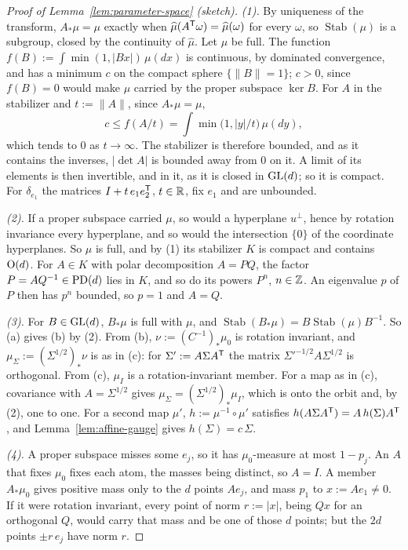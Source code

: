 \begin{proof}[Proof of Lemma~\ref{lem:parameter-space} (sketch)]
\emph{(1).} By uniqueness of the transform, $A_*\mu = \mu$ exactly when
$\widehat\mu(A^{\mathsf{T}}\omega) = \widehat\mu(\omega)$ for every $\omega$, so $\operatorname{Stab}(\mu)$ is
a subgroup, closed by the continuity of $\widehat\mu$. Let $\mu$ be full. The function
$f(B) := \int\min(1, |Bx|)\,\mu(dx)$ is continuous, by dominated convergence, and has a minimum $c$
on the compact sphere $\{\|B\| = 1\}$; $c > 0$, since $f(B) = 0$ would make $\mu$ carried by the
proper subspace $\ker B$. For $A$ in the stabilizer and $t := \|A\|$, since $A_*\mu = \mu$,
\[
  c \le f(A/t) = \int\min\bigl(1, |y|/t\bigr)\,\mu(dy) ,
\]
which tends to $0$ as $t \to \infty$. The stabilizer is therefore bounded, and as it contains the
inverses, $|\det A|$ is bounded away from $0$ on it. A limit of its elements is then invertible, and
in it, as it is closed in $\mathrm{GL}(d)$; so it is compact. For $\delta_{e_1}$ the matrices
$I + t\,e_1e_2^{\mathsf{T}}$, $t \in \mathbb{R}$, fix $e_1$ and are unbounded.

\emph{(2).} If a proper subspace carried $\mu$, so would a hyperplane $u^\perp$, hence by rotation
invariance every hyperplane, and so would the intersection $\{0\}$ of the coordinate hyperplanes.
So $\mu$ is full, and by (1) its stabilizer $K$ is compact and contains $\mathrm{O}(d)$. For $A \in K$
with polar decomposition $A = PQ$, the factor $P = AQ^{-1} \in \mathrm{PD}(d)$ lies in $K$, and so do its
powers $P^n$, $n \in \mathbb{Z}$. An eigenvalue $p$ of $P$ then has $p^n$ bounded, so $p = 1$ and $A = Q$.

\emph{(3).} For $B \in \mathrm{GL}(d)$, $B_*\mu$ is full with $\mu$, and
$\operatorname{Stab}(B_*\mu) = B\operatorname{Stab}(\mu)B^{-1}$. So (a) gives (b) by (2). From
(b), $\nu := (C^{-1})_*\mu_0$ is rotation invariant, and $\mu_\Sigma := (\Sigma^{1/2})_*\nu$ is as in
(c): for $\Sigma' := A\Sigma A^{\mathsf{T}}$ the matrix $\Sigma'^{-1/2}A\Sigma^{1/2}$ is orthogonal. From
(c), $\mu_I$ is a rotation-invariant member. For a map as in (c), covariance with
$A = \Sigma^{1/2}$ gives $\mu_\Sigma = (\Sigma^{1/2})_*\mu_I$, which is onto the orbit and, by (2),
one to one. For a second map $\mu'$, $h := \mu^{-1} \circ \mu'$ satisfies
$h(A\Sigma A^{\mathsf{T}}) = A\,h(\Sigma)A^{\mathsf{T}}$, and Lemma~\ref{lem:affine-gauge} gives $h(\Sigma) = c\,\Sigma$.

\emph{(4).} A proper subspace misses some $e_j$, so it has $\mu_0$-measure at most $1 - p_j$. An
$A$ that fixes $\mu_0$ fixes each atom, the masses being distinct, so $A = I$. A member $A_*\mu_0$
gives positive mass only to the $d$ points $Ae_j$, and mass $p_1$ to $x := Ae_1 \ne 0$. If it were
rotation invariant, every point of norm $r := |x|$, being $Qx$ for an orthogonal $Q$, would carry
that mass and be one of those $d$ points; but the $2d$ points $\pm r\,e_j$ have norm $r$.


\end{proof}
